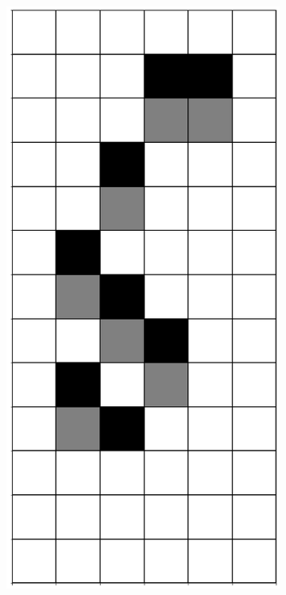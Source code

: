 \documentclass[12pt]{article}
\numberwithin{figure}{section} %
\begin{document}
\begin{figure}[H]
\begin{subfigure}{0.3\textwidth}
     \subcaption{}
   \end{subfigure}
        \begin{subfigure}{0.3\textwidth}
     \centering
     \includegraphics[angle=270,width=\linewidth]{Section4/11.2}

\end{subfigure}
\end{figure}
\end{document}
